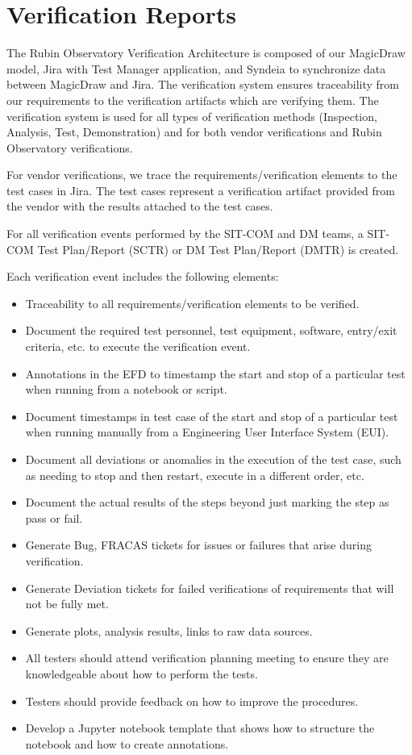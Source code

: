 \section{Verification Reports}

The Rubin Observatory Verification Architecture is composed of our MagicDraw model, Jira with Test Manager application, and Syndeia to synchronize data between MagicDraw and Jira.
The verification system ensures traceability from our requirements to the verification artifacts which are verifying them.
The verification system is used for all types of verification methods (Inspection, Analysis, Test, Demonstration) and for both vendor verifications and Rubin Observatory verifications.

For vendor verifications, we trace the requirements/verification elements to the test cases in Jira.
The test cases represent a verification artifact provided from the vendor with the results attached to the test cases.

For all verification events performed by the SIT-COM and DM teams, a SIT-COM Test Plan/Report (SCTR) or DM Test Plan/Report (DMTR) is created.

Each verification event includes the following elements:

\begin{itemize}

	\item Traceability to all requirements/verification elements to be verified.
	\item Document the required test personnel, test equipment, software, entry/exit criteria, etc. to execute the verification event.
	\item Annotations in the EFD to timestamp the start and stop of a particular test when running from a notebook or script.
	\item Document timestamps in test case of the start and stop of a particular test when running manually from a Engineering User Interface System (EUI).
	\item Document all deviations or anomalies in the execution of the test case, such as needing to stop and then restart, execute in a different order, etc.
	\item Document the actual results of the steps beyond just marking the step as pass or fail.
	\item Generate Bug, FRACAS tickets for issues or failures that arise during verification.
	\item Generate Deviation tickets for failed verifications of requirements that will not be fully met.
	\item Generate plots, analysis results, links to raw data sources.
	\item All testers should attend verification planning meeting to ensure they are knowledgeable about how to perform the tests.
	\item Testers should provide feedback on how to improve the procedures.
	\item Develop a Jupyter notebook template that shows how to structure the notebook and how to create annotations.

\end{itemize}

